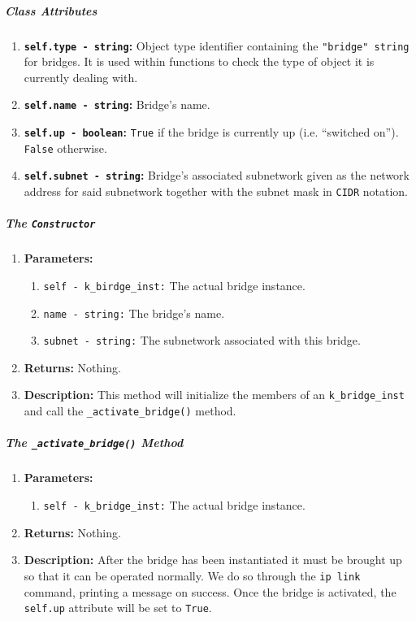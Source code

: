         \subparagraph{Class Attributes}
            \begin{enumerate}
                \item \textbf{\texttt{self.type - string}:} Object type identifier containing the \texttt{"bridge" string} for bridges. It is used within functions to check the type of object it is currently dealing with.
                \item \textbf{\texttt{self.name - string}:} Bridge's name.
                \item \textbf{\texttt{self.up - boolean}:} \texttt{True} if the bridge is currently up (i.e. ``switched on''). \texttt{False} otherwise.
                \item \textbf{\texttt{self.subnet - string}:} Bridge's associated subnetwork given as the network address for said subnetwork together with the subnet mask in \texttt{CIDR} notation.
            \end{enumerate}

        \subparagraph{The \texttt{Constructor}}
            \begin{enumerate}
                \item \textbf{Parameters:}
                \begin{enumerate}
                    \item \texttt{self - k\_birdge\_inst:} The actual bridge instance.
                    \item \texttt{name - string:} The bridge's name.
                    \item \texttt{subnet - string:} The subnetwork associated with this bridge.
                \end{enumerate}
                \item \textbf{Returns:} Nothing.
                \item \textbf{Description:} This method will initialize the members of an \texttt{k\_bridge\_inst} and call the \texttt{\_activate\_bridge()} method.
            \end{enumerate}

        \subparagraph{The \texttt{\_activate\_bridge()} Method}
            \begin{enumerate}
                \item \textbf{Parameters:}
                \begin{enumerate}
                    \item \texttt{self - k\_bridge\_inst:} The actual bridge instance.
                \end{enumerate}
                \item \textbf{Returns:} Nothing.
                \item \textbf{Description:} After the bridge has been instantiated it must be brought up so that it can be operated normally. We do so through the \texttt{ip link} command, printing a message on success. Once the bridge is activated, the \texttt{self.up} attribute will be set to \texttt{True}.
            \end{enumerate}

